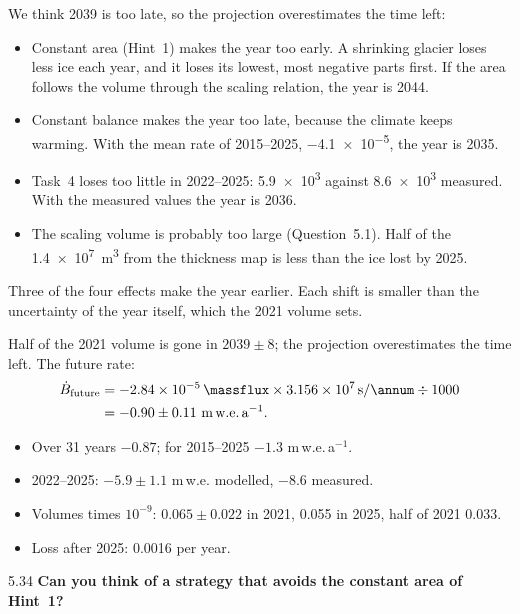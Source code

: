 \documentclass{scrartcl}
\begin{document}
\begin{reportpart}
{We think 2039 is too late, so the projection overestimates the time left:
\begin{itemize}
  \item Constant area (Hint~1) makes the year too early. A shrinking glacier loses less ice
    each year, and it loses its lowest, most negative parts first. If the area follows the
    volume through the scaling relation, the year is 2044.
  \item Constant balance makes the year too late, because the climate keeps warming. With the
    mean rate of 2015--2025, \qty{-4.1e-5}{\massflux}, the year is 2035.
  \item Task~4 loses too little in 2022--2025: \qty{5.9e3}{} against \qty{8.6e3}{\areal}
    measured. With the measured values the year is 2036.
  \item The scaling volume is probably too large (Question~5.1). Half of the
    \qty{1.4e7}{\cubic\metre} from the thickness map is less than the ice lost by 2025.
\end{itemize}
Three of the four effects make the year earlier. Each shift is smaller than the uncertainty of
the year itself, which the 2021 volume sets.

\begin{converted}
Half of the 2021 volume is gone in $2039 \pm 8$; the projection overestimates the time left.
The future rate:
\begin{align*}
  \dot B_\text{future} &= \qty{-2.84e-5}{\massflux} \times \qty{3.156e7}{\second\per\annum}
  \div 1000 \\
  &= -0.90 \pm 0.11\ \text{m\,w.e.\,a}^{-1} .
\end{align*}
\begin{itemize}
  \item Over 31 years $-0.87$; for 2015--2025 $-1.3$ m\,w.e.\,a$^{-1}$.
  \item 2022--2025: $-5.9 \pm 1.1$ m\,w.e. modelled, $-8.6$ measured.
  \item Volumes times $10^{-9}$: $0.065 \pm 0.022$ in 2021, 0.055 in 2025, half of 2021
    \qty{0.033}{\kmcubed}.
  \item Loss after 2025: \qty{0.0016}{\kmcubed} per year.
\end{itemize}
\end{converted}}

\begin{question}{5.3}{4}\label{q:53}
\textbf{Can you think of a strategy that avoids the constant area of Hint~1?}


\end{question}
\end{reportpart}
\end{document}
